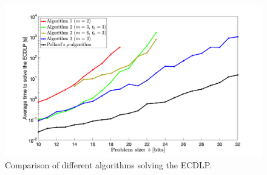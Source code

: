 \documentclass[thesis=M,english]{FITthesis}[2012/10/20]
\theoremstyle{remark}
\theoremstyle{definition}
\begin{document}
 \begin{figure}[h]
 \centering
 \hspace*{-1.3cm}
 	\includegraphics[width=1.21\textwidth]{algComparison.png}
 	\caption[Comparison of different algorithms solving the ECDLP]{Comparison of different algorithms solving the ECDLP.}
 	\label{grph1}
 \end{figure}

\end{document}
